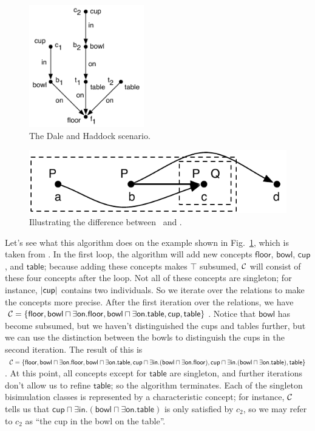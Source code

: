 \begin{figure}
  \centering
  \includegraphics[width=5cm]{pic-dale-haddock}
  \caption{The Dale and Haddock scenario.}
  \label{fig:dale-haddock}
\end{figure}

\begin{figure}
  \centering
  \includegraphics[width=\columnwidth]{pic-el-vs-alc}
  \caption{Illustrating the difference between \el\ and \alc.}
  \label{fig:el-vs-alc}
\end{figure}

Let's see what this algorithm does on the example shown in
Fig.~\ref{fig:dale-haddock}, which is taken from
.  In the first loop,
the algorithm will add new concepts $\mathsf{floor}$, $\mathsf{bowl}$,
$\mathsf{cup}$, and $\mathsf{table}$; because adding these concepts
makes $\top$ subsumed, $\mathcal{C}$ will consist of these four concepts after
the loop.  Not all of these concepts are singleton; for instance,
$|\mathsf{cup}|$ contains two individuals.  So we iterate over
the relations to make the concepts more precise.  After the first
iteration over the relations, we have $\mathcal{C} = \{ \mathsf{floor},
\mathsf{bowl} \sqcap \exists \mathsf{on}.\mathsf{floor}, \mathsf{bowl}
\sqcap \exists \mathsf{on}.\mathsf{table}, \mathsf{cup},
\mathsf{table} \}$. Notice that $\mathsf{bowl}$ has become subsumed,
but we haven't distinguished the cups and tables further, but we can
use the distinction between the bowls to distinguish the cups in the
second iteration.  The result of this is $\mathcal{C} = \{ \mathsf{floor},
\mathsf{bowl} \sqcap \exists \mathsf{on}.\mathsf{floor}, \mathsf{bowl}
\sqcap \exists \mathsf{on}.\mathsf{table}, \mathsf{cup} \sqcap \exists
\mathsf{in}. (\mathsf{bowl} \sqcap \exists
\mathsf{on}.\mathsf{floor}), \mathsf{cup} \sqcap \exists
\mathsf{in}. (\mathsf{bowl} \sqcap \exists
\mathsf{on}.\mathsf{table}), \mathsf{table} \}$.  At this point, all
concepts except for $\mathsf{table}$ are singleton, and further
iterations don't allow us to refine $\mathsf{table}$; so the algorithm
terminates.  Each of the singleton bisimulation classes is represented
by a characteristic concept; for instance, $\mathcal{C}$ tells us that
$\mathsf{cup} \sqcap \exists \mathsf{in}. (\mathsf{bowl} \sqcap
\exists \mathsf{on}.\mathsf{table})$ is only satisfied by $c_2$, so we
may refer to $c_2$ as ``the cup in the bowl on the table''.

